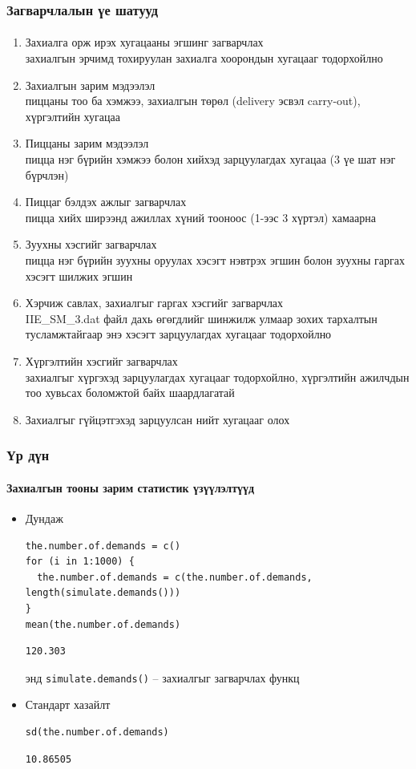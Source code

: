 \documentclass{beamer}
\begin{document}
\begin{frame}[fragile]
\frametitle{Загварчлалын үе шатууд}\framesubtitle{}
\footnotesize
\begin{enumerate}
\item Захиалга орж ирэх хугацааны эгшинг загварчлах \\ {\scriptsize захиалгын эрчимд тохируулан захиалга хоорондын хугацааг тодорхойлно}
\item Захиалгын зарим мэдээлэл \\ {\scriptsize пиццаны тоо ба хэмжээ, захиалгын төрөл (delivery эсвэл carry-out), хүргэлтийн хугацаа}
\item Пиццаны зарим мэдээлэл \\ {\scriptsize пицца нэг бүрийн хэмжээ болон хийхэд зарцуулагдах хугацаа (3 үе шат нэг бүрчлэн)}
\item Пиццаг бэлдэх ажлыг загварчлах \\ {\scriptsize пицца хийх ширээнд ажиллах хүний тооноос (1-ээс 3 хүртэл) хамаарна}
\item Зуухны хэсгийг загварчлах \\ {\scriptsize пицца нэг бүрийн зуухны оруулах хэсэгт нэвтрэх эгшин болон зуухны гаргах хэсэгт шилжих эгшин}
\item Хэрчиж савлах, захиалгыг гаргах хэсгийг загварчлах \\ {\scriptsize IIE\_SM\_3.dat файл дахь өгөгдлийг шинжилж улмаар зохих тархалтын тусламжтайгаар энэ хэсэгт зарцуулагдах хугацааг тодорхойлно}
\item Хүргэлтийн хэсгийг загварчлах \\ {\scriptsize захиалгыг хүргэхэд зарцуулагдах хугацааг тодорхойлно, хүргэлтийн ажилчдын тоо хувьсах боломжтой байх шаардлагатай}
\item Захиалгыг гүйцэтгэхэд зарцуулсан нийт хугацааг олох
\end{enumerate}
\end{frame}

\begin{frame}[fragile]
\frametitle{Үр дүн}\framesubtitle{Захиалгын тооны зарим статистик үзүүлэлтүүд}
\begin{itemize}
\item Дундаж
\begin{lstlisting}[morekeywords={in}]
the.number.of.demands = c()
for (i in 1:1000) {
  the.number.of.demands = c(the.number.of.demands, length(simulate.demands()))
}
mean(the.number.of.demands)
\end{lstlisting}
\begin{lstlisting}
120.303
\end{lstlisting}
энд \lstinline|simulate.demands()| -- захиалгыг загварчлах функц
\item Стандарт хазайлт
\begin{lstlisting}
sd(the.number.of.demands)
\end{lstlisting}
\begin{lstlisting}
10.86505
\end{lstlisting}
\end{itemize}
\end{frame}
\end{document}
